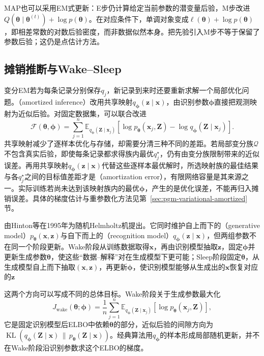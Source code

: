 MAP也可以采用EM式更新：E步仍计算给定当前参数的潜变量后验，M步改进$Q(\bm{\theta}\mid\bm{\theta}^{(t)})+\log p(\bm{\theta})$。在对应条件下，单调对象变成$\ell(\bm{\theta})+\log p(\bm{\theta})$，即相差常数的对数后验密度，而非数据似然本身。把先验引入M步不等于保留了参数后验；这仍是点估计方法。

\subsection{摊销推断与Wake--Sleep}
\label{sec:pgm-parameter-learning-amortized}

变分EM若为每条记录分别保存$q_j$，新记录到来时还要重新求解一个局部优化问题。（amortized inference）改用共享映射$q_{\bm{\phi}}(\bm{z}\mid\bm{x})$，由识别参数$\bm{\phi}$直接把观测映射为近似后验。对固定数据集，可以联合改进
\[
  \mathcal{F}(\bm{\theta},\bm{\phi})
  =\sum_{j=1}^n\mathbb{E}_{q_{\bm{\phi}}(\bm{Z}\mid\bm{x}_j)}
    [\log p_{\bm{\theta}}(\bm{x}_j,\bm{Z})
     -\log q_{\bm{\phi}}(\bm{Z}\mid\bm{x}_j)].
\]
共享映射减少了逐样本优化与存储，却需要分清三种不同的差距。若局部变分族$\mathcal{Q}$不包含真实后验，即使每条记录都求得族内最优$q_j^\star$，仍有由变分族限制带来的近似误差。再用共享映射$q_{\bm{\phi}}(\bm{z}\mid\bm{x})$代替这些逐样本最优解时，所选映射族的最佳结果与各$q_j^\star$之间的目标值差距才是（amortization error），有限网络容量是其来源之一。实际训练若尚未达到该映射族内的最优$\bm{\phi}$，产生的是优化误差，不能再归入摊销误差。具体的梯度估计与重参数化方法见第~\ref{sec:pgm-variational-amortized}节。

由Hinton等在1995年为随机Helmholtz机提出。它同时维护自上而下的（generative model）$p_{\bm{\theta}}(\bm{x},\bm{z})$与自下而上的（recognition model）$q_{\bm{\phi}}(\bm{z}\mid\bm{x})$，但两组参数不在同一个阶段更新。Wake阶段从训练数据取得$\bm{x}$，再由识别模型抽取$\bm{z}$，固定$\bm{\phi}$并更新生成参数$\bm{\theta}$，使这些“数据--解释”对在生成模型下更可能；Sleep阶段固定$\bm{\theta}$，从生成模型自上而下抽取$(\bm{x},\bm{z})$，再更新$\bm{\phi}$，使识别模型能够从生成出的$\bm{x}$恢复对应的$\bm{z}$

这两个方向可以写成不同的总体目标。Wake阶段关于生成参数最大化
\begin{equation}
  J_{\mathrm{wake}}(\bm{\theta};\bm{\phi})
  =\frac{1}{n}\sum_{j=1}^n
    \mathbb{E}_{q_{\bm{\phi}}(\bm{Z}\mid\bm{x}_j)}
      [\log p_{\bm{\theta}}(\bm{x}_j,\bm{Z})],
  \label{eq:pgm-parameter-learning-wake-objective}
\end{equation}
它是固定识别模型后ELBO中依赖$\bm{\theta}$的部分，近似后验的间隙方向为$\operatorname{KL}(q_{\bm{\phi}}(\bm{Z}\mid\bm{x})\,\|\,p_{\bm{\theta}}(\bm{Z}\mid\bm{x}))$。经典算法用$q_{\bm{\phi}}$的样本形成局部随机更新，并不在Wake阶段沿识别参数求这个ELBO的梯度。


